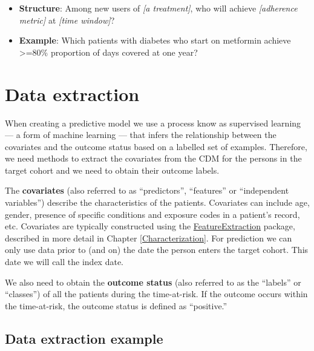 \documentclass[11pt]{book}
\providecommand{\tightlist}{%
  \setlength{\itemsep}{0pt}\setlength{\parskip}{0pt}}
\theoremstyle{definition}
\theoremstyle{definition}
\theoremstyle{definition}
\theoremstyle{remark}
\begin{document}
\begin{itemize}
  \begin{itemize}
  \tightlist
  \item
    \textbf{Structure}: Among new users of \emph{{[}a treatment{]}}, who will achieve \emph{{[}adherence metric{]}} at \emph{{[}time window{]}}?
  \item
    \textbf{Example}: Which patients with diabetes who start on metformin achieve \textgreater=80\% proportion of days covered at one year?
  \end{itemize}
\end{itemize}

\hypertarget{data-extraction-2}{%
\section{Data extraction}\label{data-extraction-2}}

When creating a predictive model we use a process know as supervised learning --- a form of machine learning --- that infers the relationship between the covariates and the outcome status based on a labelled set of examples. Therefore, we need methods to extract the covariates from the CDM for the persons in the target cohort and we need to obtain their outcome labels.

The \textbf{covariates} (also referred to as ``predictors'', ``features'' or ``independent variables'') describe the characteristics of the patients. Covariates can include age, gender, presence of specific conditions and exposure codes in a patient's record, etc. Covariates are typically constructed using the \href{https://ohdsi.github.io/FeatureExtraction/}{FeatureExtraction} package, described in more detail in Chapter \ref{Characterization}. For prediction we can only use data prior to (and on) the date the person enters the target cohort. This date we will call the index date.

We also need to obtain the \textbf{outcome status} (also referred to as the ``labels'' or ``classes'') of all the patients during the time-at-risk. If the outcome occurs within the time-at-risk, the outcome status is defined as ``positive.''   

\hypertarget{data-extraction-example}{%
\subsection{Data extraction example}\label{data-extraction-example}}
\end{document}
